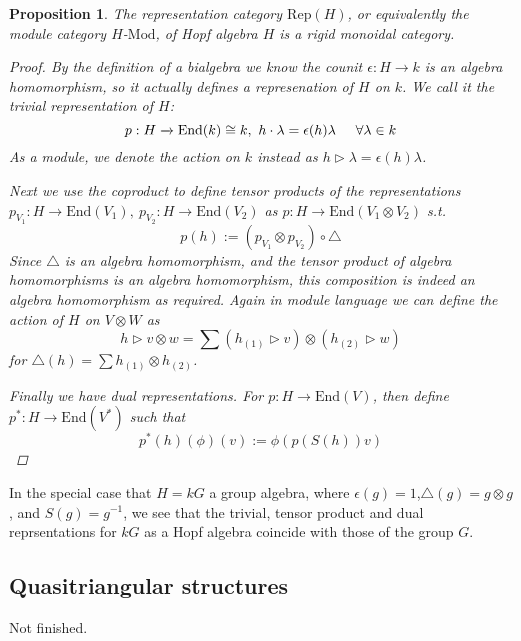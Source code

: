 \documentclass[11pt]{article}
\newcommand{\bb}{\medbreak}
\newcommand{\nt}{\noindent}
\newcommand{\rt}{\xrightarrow{}}
\newcommand{\End}{\text{End}}
\newcommand{\Rep}{\text{Rep}}
\newcommand{\Mod}{\text{Mod}}
\newtheorem{proposition}[lemma]{Proposition}
\theoremstyle{definition}
\begin{document}
\begin{proposition} The representation category $\Rep(H)$, or equivalently the module category $H$-$\Mod$, of Hopf algebra $H$ is a rigid monoidal category.
\begin{proof}
By the definition of a bialgebra we know the counit $\epsilon:H\rt k$ is an algebra homomorphism, so it actually defines a represenation of $H$ on $k$. We call it the trivial representation of $H$: 
$$p:H \rt \End(k)\cong k,\ h \cdot\lambda=\epsilon(h)\lambda\hspace{.5cm} \forall \lambda\in k$$
As a module, we denote the action on $k$ instead as $h\rhd \lambda=\epsilon(h)\lambda$.\bb

\nt Next we use the coproduct to define tensor products of the representations $p_{V_1}:H\rt \text{End}(V_1),\ p_{V_2}:H\rt \text{End}(V_2)$ as $p:H\rt \text{End}(V_1\otimes V_2)$ s.t.
$$p(h):=(p_{V_1}\otimes p_{V_2})\circ \triangle$$
Since $\triangle$ is an algebra homomorphism, and the tensor product of algebra homomorphisms is an algebra homomorphism, this composition is indeed an algebra homomorphism as required. Again in module language we can define the action of $H$ on $V\otimes W$ as 
$$h\rhd v\otimes w=\sum (h_{(1)}\rhd v)\otimes (h_{(2)}\rhd w)$$
for $\triangle(h)=\sum h_{(1)}\otimes h_{(2)}$.\bb

\nt Finally we have dual representations. For $p:H\rt \text{End}(V)$, then define $p^*:H\rt \text{End}(V^*)$ such that 
$$p^*(h)(\phi)(v):=\phi(p(S(h))v)$$
\end{proof}
\end{proposition}

\nt In the special case that $H=kG$ a group algebra, where $\epsilon(g)=1$,$\triangle(g)=g\otimes g$, and $S(g)=g^{-1}$, we see that the trivial, tensor product and dual reprsentations for $kG$ as a Hopf algebra coincide with those of the group $G$.


\subsection{Quasitriangular structures}
Not finished.
\end{document}
